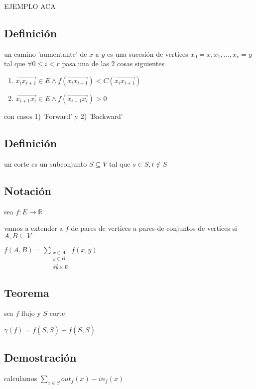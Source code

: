 \documentclass[12pt]{article}
\begin{document}
EJEMPLO ACA

\subsection*{Definición}
un camino 'aumentante' de $x$ a $y$ es una sucesión de vertices $x_0 = x,  x_1, ..., x_r = y$ tal que $\forall 0 \leq i < r$ pasa una de las 2 cosas siguientes

\begin{enumerate}
\item \(\overrightarrow{x_ix_{i+1}} \in E \land f(\overrightarrow{x_ix_{i+1}}) < C(\overrightarrow{x_ix_{i+1}})\)
\item \(\overrightarrow{x_{i+1}x_i} \in E \land f(\overrightarrow{x_{i+1}x_i}) > 0\)
\end{enumerate}

con casos 1) 'Forward'  y 2) 'Backward'

\subsection*{Definición}

un corte es un subconjunto $S \subseteq V$ tal que $s \in S, t \notin S$

\subsection*{Notación}
sea $f: E \rightarrow \mathbb{R}$

vamos a extender a $f$ de pares de vertices a pares de conjuntos de vertices si $A,B \subseteq V$

\(
f(A,B) = \sum_{\substack{x \in A \\ y \in B \\ \overrightarrow{xy} \in E}} f(x, y)
\)

\begin{center}
\section*{Teorema}
sea $f$ flujo y $S$ corte

$\gamma(f) = f(S,\overline{S}) - f(\overline{S}, S)$
\end{center}

\subsection*{Demostración}

calculamos $\sum_{x \in S}out_f(x) - in_f(x)$ \\
\end{document}
